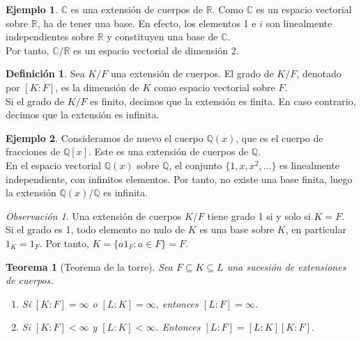 \documentclass{report}
\newtheorem{theorem}{Teorema}[chapter]
\theoremstyle{remark}
\newtheorem*{remark}{Observación}
\theoremstyle{definition}
\newtheorem{definition}{Definición}[chapter]
\theoremstyle{definition}
\theoremstyle{definition}
\newtheorem*{example}{Ejemplo}
\begin{document}
\begin{example}
    $\mathbb{C}$ es una extensión de cuerpos de $\mathbb{R}$. Como $\mathbb{C}$ es un espacio vectorial sobre $\mathbb{R}$, ha de tener una base.
    En efecto, los elementos 1 e $i$ son linealmente independientes sobre $\mathbb{R}$ y constituyen una base de $\mathbb{C}$.\\
    Por tanto, $\mathbb{C}/\mathbb{R}$ es un espacio vectorial de dimensión 2.
\end{example}

\begin{definition}
    Sea $K/F$ una extensión de cuerpos. El grado de $K/F$, denotado por $[K : F]$, es la dimensión de $K$ como espacio vectorial sobre $F$.\\
    Si el grado de $K/F$ es finito, decimos que la extensión es finita. En caso contrario, decimos que la extensión es infinita.
\end{definition}

\begin{example}
    Consideramos de nuevo el cuerpo $\mathbb{Q}(x)$, que es el cuerpo de fracciones de $\mathbb{Q}[x]$. Este es una extensión de cuerpos de $\mathbb{Q}$.\\
    En el espacio vectorial $\mathbb{Q}(x)$ sobre $\mathbb{Q}$, el conjunto $\{1, x, x^2, \dots\}$ es linealmente independiente, con infinitos elementos.
    Por tanto, no existe una base finita, luego la extensión $\mathbb{Q}(x)/\mathbb{Q}$ es infinita.
\end{example}

\begin{remark}
    Una extensión de cuerpos $K/F$ tiene grado 1 si y solo si $K = F$.\\
    Si el grado es 1, todo elemento no nulo de $K$ es una base sobre $K$, en particular $1_K = 1_F$. Por tanto, $K = \{ a1_F : a \in F \}  = F$.
\end{remark}

\begin{theorem}[Teorema de la torre]
    Sea $F \subseteq K \subseteq L$ una sucesión de extensiones de cuerpos.
    \begin{enumerate}
        \item Si $[K : F] = \infty$ o $[L : K] = \infty$, entonces $[L : F] = \infty$.
        \item Si $[K : F] < \infty$ y $[L : K] < \infty$. Entonces $[L : F] = [L : K] [K : F]$.
    \end{enumerate}
\end{theorem}
\end{document}
